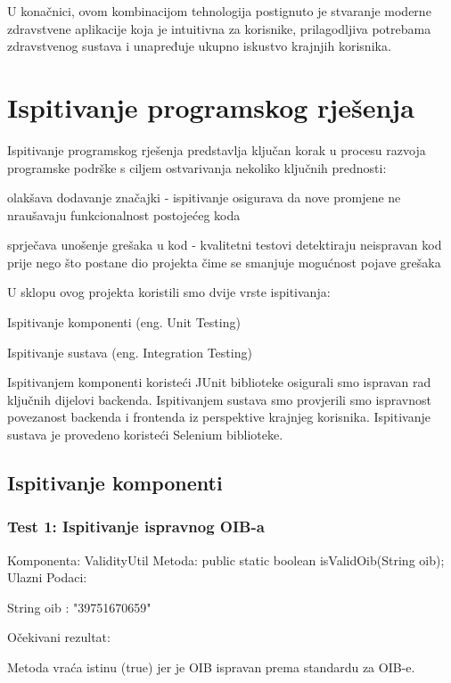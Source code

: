 			 U konačnici, ovom kombinacijom tehnologija postignuto je stvaranje moderne zdravstvene aplikacije koja je intuitivna za korisnike, prilagodljiva potrebama zdravstvenog sustava i unapređuje ukupno iskustvo krajnjih korisnika.
			\eject 
	
		\section{Ispitivanje programskog rješenja}
			Ispitivanje programskog rješenja predstavlja ključan korak u procesu razvoja programske podrške s ciljem ostvarivanja nekoliko ključnih prednosti:
			\begin{packed_item}
				\item olakšava dodavanje značajki - ispitivanje osigurava da nove promjene ne nraušavaju funkcionalnost postojećeg koda
				\item sprječava unošenje grešaka u kod - kvalitetni testovi detektiraju neispravan kod prije nego što postane dio projekta čime se smanjuje mogućnost pojave grešaka
			\end{packed_item}
			
			U sklopu ovog projekta koristili smo dvije vrste ispitivanja:
			\begin{packed_item}
				\item Ispitivanje komponenti (eng. Unit Testing)
				\item Ispitivanje sustava (eng. Integration Testing)
			\end{packed_item}
			
			
			Ispitivanjem komponenti koristeći JUnit biblioteke osigurali smo ispravan rad ključnih dijelovi backenda. Ispitivanjem sustava smo provjerili smo ispravnost povezanost backenda i frontenda iz perspektive krajnjeg korisnika.
			Ispitivanje sustava je provedeno koristeći Selenium biblioteke.
			
			\subsection{Ispitivanje komponenti}
			\subsubsection*{Test 1: Ispitivanje ispravnog OIB-a}
			Komponenta: ValidityUtil \newline
			Metoda: public static boolean isValidOib(String oib); \newline
			Ulazni Podaci: 
			\begin{packed_item}
				\item String oib : "39751670659"
			\end{packed_item}
			Očekivani rezultat:
			\begin{packed_item}
				\item Metoda vraća istinu (true) jer je OIB ispravan prema standardu za OIB-e.
			\end{packed_item}

